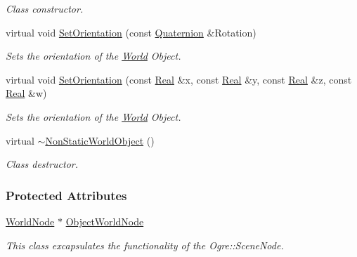 \begin{DoxyCompactItemize}
\begin{DoxyCompactList}\small\item\em Class constructor. \item\end{DoxyCompactList}\item 
virtual void \hyperlink{classMezzanine_1_1NonStaticWorldObject_a93ffa6d7e23ec9015fdcf7a1b5cc6828}{SetOrientation} (const \hyperlink{classMezzanine_1_1Quaternion}{Quaternion} \&Rotation)
\begin{DoxyCompactList}\small\item\em Sets the orientation of the \hyperlink{classMezzanine_1_1World}{World} Object. \item\end{DoxyCompactList}\item 
virtual void \hyperlink{classMezzanine_1_1NonStaticWorldObject_ad726fa6c7934a325599120366cf1d900}{SetOrientation} (const \hyperlink{namespaceMezzanine_a726731b1a7df72bf3583e4a97282c6f6}{Real} \&x, const \hyperlink{namespaceMezzanine_a726731b1a7df72bf3583e4a97282c6f6}{Real} \&y, const \hyperlink{namespaceMezzanine_a726731b1a7df72bf3583e4a97282c6f6}{Real} \&z, const \hyperlink{namespaceMezzanine_a726731b1a7df72bf3583e4a97282c6f6}{Real} \&w)
\begin{DoxyCompactList}\small\item\em Sets the orientation of the \hyperlink{classMezzanine_1_1World}{World} Object. \item\end{DoxyCompactList}\item 
\hypertarget{classMezzanine_1_1NonStaticWorldObject_a5bfa4c2acd83b5556bcf16d73b8eeba1}{
virtual \hyperlink{classMezzanine_1_1NonStaticWorldObject_a5bfa4c2acd83b5556bcf16d73b8eeba1}{$\sim$NonStaticWorldObject} ()}
\label{classMezzanine_1_1NonStaticWorldObject_a5bfa4c2acd83b5556bcf16d73b8eeba1}

\begin{DoxyCompactList}\small\item\em Class destructor. \item\end{DoxyCompactList}\end{DoxyCompactItemize}
\subsubsection*{Protected Attributes}
\begin{DoxyCompactItemize}
\item 
\hypertarget{classMezzanine_1_1NonStaticWorldObject_a03b42146013f8fe6e6aee1eb9fcf4c0a}{
\hyperlink{classMezzanine_1_1WorldNode}{WorldNode} $\ast$ \hyperlink{classMezzanine_1_1NonStaticWorldObject_a03b42146013f8fe6e6aee1eb9fcf4c0a}{ObjectWorldNode}}
\label{classMezzanine_1_1NonStaticWorldObject_a03b42146013f8fe6e6aee1eb9fcf4c0a}

\begin{DoxyCompactList}\small\item\em This class excapsulates the functionality of the Ogre::SceneNode. \item\end{DoxyCompactList}\end{DoxyCompactItemize}


